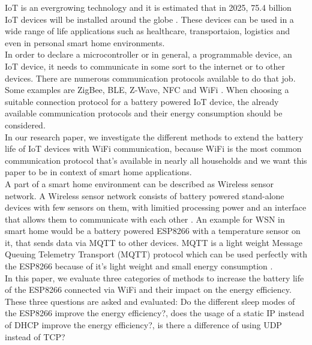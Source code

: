 IoT is an evergrowing technology and it is estimated that in 2025, 75.4 billion IoT devices will be installed around the globe \cite{lucero2016iot}. These devices can be used in a wide range of life applications such as healthcare, transportaion, logistics and even in personal smart home environments.\\  
In order to declare a microcontroller or in general, a programmable device, an IoT device, it needs to communicate in some sort to the internet or to other devices. There are numerous communication protocols available to do that job. Some examples are ZigBee, BLE, Z-Wave, NFC and WiFi \cite{8079928}. 
When choosing a suitable connection protocol for a battery powered IoT device, the already available communication protocols and their energy consumption should be considered.\\
In our research paper, we investigate the different methods to extend the battery life of IoT devices with WiFi communication, because WiFi is the most common communication protocol that's available in nearly all households and we want this paper to be in context of smart home applications.\\
A part of a smart home environment can be described as Wireless sensor network. A Wireless sensor network consists of battery powered stand-alone devices with few sensors on them, with limitied processing power and an interface that allows them to communicate with each other \cite{wsn}. 
An example for WSN in smart home would be a battery powered ESP8266 with a temperature sensor on it, that sends data via MQTT to other devices.
MQTT is a light weight Message Queuing Telemetry Transport (MQTT) protocol which can be used perfectly with the ESP8266 because of it's light weight and small energy consumption \cite{kodali_mqtt_2016}.\\
In this paper, we evaluate three categories of methods to increase the battery life of the ESP8266 connected via WiFi and their impact on the energy efficiency.
These three questions are asked and evaluated: Do the different sleep modes of the ESP8266 improve the energy efficiency?, does the usage of a static IP instead of DHCP improve the energy efficiency?, is there a difference of using UDP instead of TCP?
